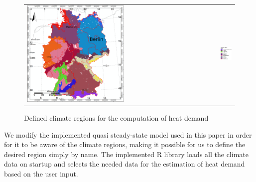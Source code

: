 \documentclass[runningheads,a4paper]{llncs}
\begin{document}
\begin{figure}
\centering
\begin{tabular}{lr}
\includegraphics[width=0.6\textwidth]{FIGURES/climateZones.png}&
\includegraphics[width=0.3\textwidth]{FIGURES/climateZones_legend.png}
\end{tabular}
\caption{Defined climate regions for the computation of heat
demand}\label{fig:climateZones}
\end{figure}

We modify the implemented quasi steady-state model used in this paper in order
for it to be aware of the climate regions, making it possible for us to define the
desired region simply by name. The implemented R library loads all the climate data on
startup and selects the needed data for the estimation of heat demand based on
the user input.
\\

%
\end{document}
